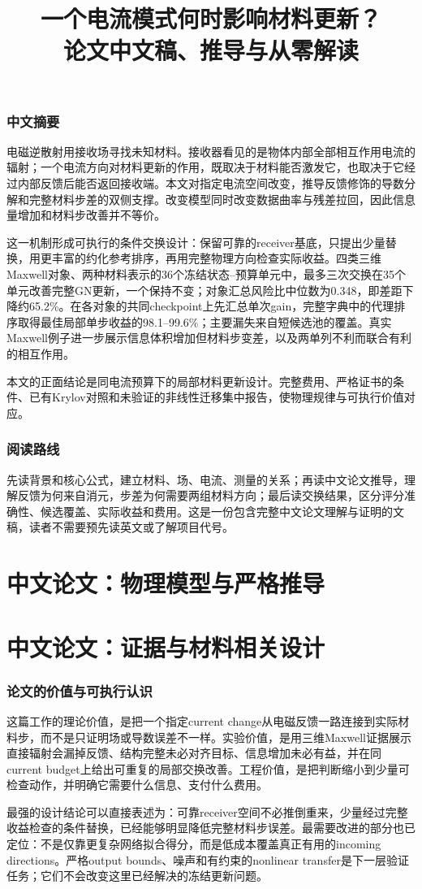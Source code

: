 \documentclass[UTF8,a4paper,11pt,fontset=none]{ctexart}
\title{一个电流模式何时影响材料更新？\\论文中文稿、推导与从零解读}\author{}\date{}
\begin{document}
\maketitle
\section*{中文摘要}
电磁逆散射用接收场寻找未知材料。接收器看见的是物体内部全部相互作用电流的辐射；一个电流方向对材料更新的作用，既取决于材料能否激发它，也取决于它经过内部反馈后能否返回接收端。本文对指定电流空间改变，推导反馈修饰的导数分解和完整材料步差的双侧支撑。改变模型同时改变数据曲率与残差拉回，因此信息量增加和材料步改善并不等价。

这一机制形成可执行的条件交换设计：保留可靠的receiver基底，只提出少量替换，用更丰富的约化参考排序，再用完整物理方向检查实际收益。四类三维Maxwell对象、两种材料表示的36个冻结状态--预算单元中，最多三次交换在35个单元改善完整GN更新，一个保持不变；对象汇总风险比中位数为0.348，即差距下降约65.2\%。在各对象的共同checkpoint上先汇总单次gain，完整字典中的代理排序取得最佳局部单步收益的98.1--99.6\%；主要漏失来自短候选池的覆盖。真实Maxwell例子进一步展示信息体积增加但材料步变差，以及两单列不利而联合有利的相互作用。

本文的正面结论是同电流预算下的局部材料更新设计。完整费用、严格证书的条件、已有Krylov对照和未验证的非线性迁移集中报告，使物理规律与可执行价值对应。
\section*{阅读路线}
先读背景和核心公式，建立材料、场、电流、测量的关系；再读中文论文推导，理解反馈为何来自消元，步差为何需要两组材料方向；最后读交换结果，区分评分准确性、候选覆盖、实际收益和费用。这是一份包含完整中文论文理解与证明的文稿，读者不需要预先读英文或了解项目代号。
\setcounter{tocdepth}{1}\tableofcontents\clearpage


\clearpage
\part{中文论文：物理模型与严格推导}



\clearpage
\part{中文论文：证据与材料相关设计}


\section{论文的价值与可执行认识}
这篇工作的理论价值，是把一个指定current change从电磁反馈一路连接到实际材料步，而不是只证明场或导数误差不一样。实验价值，是用三维Maxwell证据展示直接辐射会漏掉反馈、结构完整未必对齐目标、信息增加未必有益，并在同current budget上给出可重复的局部交换改善。工程价值，是把判断缩小到少量可检查动作，并明确它需要什么信息、支付什么费用。

最强的设计结论可以直接表述为：可靠receiver空间不必推倒重来，少量经过完整收益检查的条件替换，已经能够明显降低完整材料步误差。最需要改进的部分也已定位：不是仅靠更复杂网络拟合得分，而是低成本覆盖真正有用的incoming directions。严格output bounds、噪声和有约束的nonlinear transfer是下一层验证任务；它们不会改变这里已经解决的冻结更新问题。
\clearpage{\small\setlength{\parskip}{0pt}}
\end{document}
